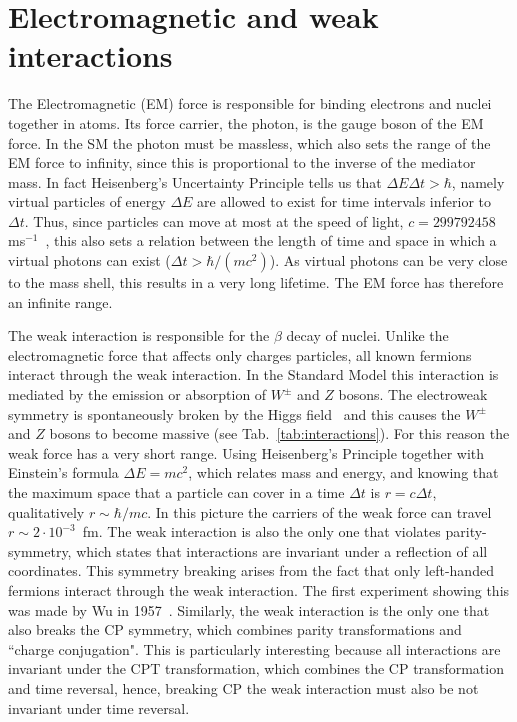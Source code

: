 \section{Electromagnetic and weak interactions}

The Electromagnetic (EM) force is responsible for binding electrons and nuclei together in atoms.
Its force carrier, the photon, is the gauge boson of the EM force. In the SM the photon must be massless,
which also sets the range of the EM force to infinity, since this is proportional to the inverse of the mediator mass.
In fact Heisenberg's Uncertainty Principle tells us that $\Delta E \Delta t > \hbar$, namely virtual particles
of energy $\Delta E$ are allowed to exist for time intervals inferior to $\Delta t$. Thus, since particles can move
at most at the speed of light, $c = 299792458$ ms$^{-1}$~\cite{PDG2014}, this also sets a relation between the length 
of time and space in which a virtual photons can exist ($\Delta t > \hbar / (mc^2)$). As virtual photons can be very
close to the mass shell, this results in a very long lifetime. The EM force has therefore an infinite range.

The weak interaction is responsible for the $\beta$ decay of nuclei. Unlike the electromagnetic force that affects only
charges particles, all known fermions interact through the weak interaction. In the Standard Model this interaction is mediated
by the emission or absorption of $W^\pm$ and $Z$ bosons. The electroweak symmetry is spontaneously broken by the Higgs
field~\cite{Strocchi:1977za} and this causes the $W^\pm$ and $Z$ bosons to become massive (see 
Tab.~\ref{tab:interactions}).
For this reason the weak force has a very short range. Using Heisenberg's Principle together with Einstein's formula 
$\Delta E = m c^2$, which relates mass and energy, and knowing that the maximum space that a particle can cover in a time 
$\Delta t$ is $r = c \Delta t$, qualitatively $r \sim \hbar / mc$. In this picture the carriers of the weak force can travel
$r \sim 2 \cdot 10^{-3}$~fm.
The weak interaction is also the only one that violates parity-symmetry, which states that interactions are invariant under
a reflection of all coordinates. This symmetry breaking arises from the fact that only left-handed fermions interact through
the weak interaction. The first experiment showing this was made by Wu in 1957~\cite{Wu:1957my}. Similarly, the weak interaction
is the only one that also breaks the CP symmetry, which combines parity transformations and ``charge conjugation".
This is particularly interesting because all interactions are invariant under the CPT transformation, which combines the CP
transformation and time reversal, hence, breaking CP the weak interaction must also be not invariant under time reversal.

